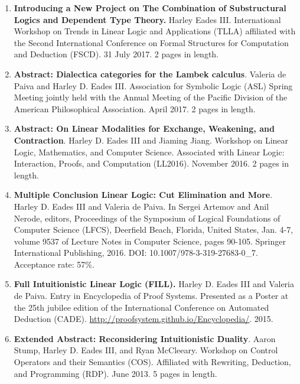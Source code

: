 \documentclass[11pt]{article}
\begin{document}
\begin{enumerate}
  \item[] \textbf{Introducing a New Project on The Combination of
    Substructural Logics and Dependent Type Theory.} Harley Eades III.
    International Workshop on Trends in Linear Logic and Applications
    (TLLA) affiliated with the Second International Conference on
    Formal Structures for Computation and Deduction (FSCD). 31 July
    2017. 2 pages in length.
    
  \item[] \textbf{Abstract: Dialectica categories for the Lambek
    calculus}.  Valeria de Paiva and Harley D. Eades III. Association for
    Symbolic Logic (ASL) Spring Meeting jointly held with the Annual
    Meeting of the Pacific Division of the American Philosophical
    Association.  April 2017.  2 pages in length.    
    
  \item[] \textbf{Abstract: On Linear Modalities for Exchange,
    Weakening, and Contraction}.  Harley D. Eades III and Jiaming Jiang.
    Workshop on Linear Logic, Mathematics, and Computer
    Science. Associated with Linear Logic: Interaction, Proofs, and
    Computation (LL2016).  November 2016. 2 pages in length.

  \item[] \textbf{Multiple Conclusion Linear Logic: Cut Elimination and
    More}.  Harley D. Eades III and Valeria de Paiva. In Sergei Artemov
    and Anil Nerode, editors, Proceedings of the Symposium of Logical
    Foundations of Computer Science (LFCS), Deerfield Beach, Florida,
    United States, Jan. 4-7, volume 9537 of Lecture Notes in Computer
    Science, pages 90-105. Springer International Publishing,
    2016. DOI: 10.1007/978-3-319-27683-0\_7.  Acceptance rate: 57\%.

  \item[] \textbf{Full Intuitionistic Linear Logic (FILL).} Harley
    D. Eades III and Valeria de Paiva. Entry in Encyclopedia of Proof
    Systems. Presented as a Poster at the 25th jubilee edition of the
    International Conference on Automated Deduction
    (CADE). \url{http://proofsystem.github.io/Encyclopedia/}. 2015.
    
  \item[] \textbf{Extended Abstract: Reconsidering Intuitionistic
    Duality}.  Aaron Stump, Harley D. Eades III, and Ryan
    McCleeary. Workshop on Control Operators and their Semantics
    (COS).  Affiliated with Rewriting, Deduction, and Programming
    (RDP). June 2013.  5 pages in length.


\end{enumerate}
\end{document}
